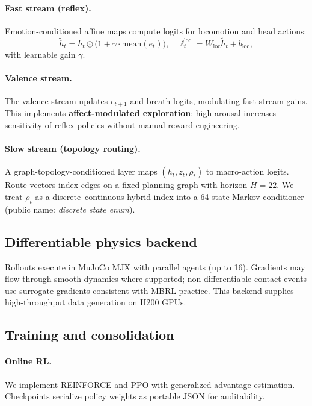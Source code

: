 \documentclass[11pt,a4paper]{article}
\begin{document}
\paragraph{Fast stream (reflex).}
Emotion-conditioned affine maps compute logits for locomotion and head actions:
\begin{equation}
\tilde{h}_t = h_t \odot \bigl(1 + \gamma \cdot \mathrm{mean}(e_t)\bigr), \quad
\ell^{\mathrm{loc}}_t = W_{\mathrm{loc}} \tilde{h}_t + b_{\mathrm{loc}},
\end{equation}
with learnable gain $\gamma$.

\paragraph{Valence stream.}
The valence stream updates $e_{t+1}$ and breath logits, modulating fast-stream gains. This implements \textbf{affect-modulated exploration}: high arousal increases sensitivity of reflex policies without manual reward engineering.

\paragraph{Slow stream (topology routing).}
A graph-topology-conditioned layer maps $(h_t, z_t, \rho_t)$ to macro-action logits. Route vectors index edges on a fixed planning graph with horizon $H{=}22$. We treat $\rho_t$ as a discrete--continuous hybrid index into a 64-state Markov conditioner (public name: \emph{discrete state enum}).

\subsection{Differentiable physics backend}

Rollouts execute in MuJoCo MJX with parallel agents (up to 16). Gradients may flow through smooth dynamics where supported; non-differentiable contact events use surrogate gradients consistent with MBRL practice. This backend supplies high-throughput data generation on H200 GPUs.

\subsection{Training and consolidation}

\paragraph{Online RL.}
We implement REINFORCE and PPO with generalized advantage estimation. Checkpoints serialize policy weights as portable JSON for auditability.
\end{document}
